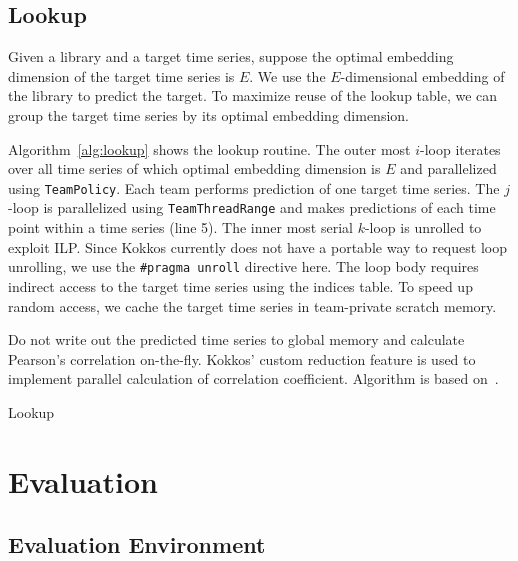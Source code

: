 \documentclass[conference]{IEEEtran}
\begin{document}
\subsection{Lookup}

Given a library and a target time series, suppose the optimal embedding
dimension of the target time series is $E$. We use the $E$-dimensional embedding
of the library to predict the target. To maximize reuse of the lookup table, we
can group the target time series by its optimal embedding dimension.

Algorithm~\ref{alg:lookup} shows the lookup routine. The outer most $i$-loop
iterates over all time series of which optimal embedding dimension is $E$ and
parallelized using \texttt{TeamPolicy}. Each team performs prediction of one
target time series. The $j$-loop is parallelized using \texttt{TeamThreadRange}
and makes predictions of each time point within a time series (line 5). The
inner most serial $k$-loop is unrolled to exploit ILP\@. Since Kokkos currently
does not have a portable way to request loop unrolling, we use the
\texttt{\#pragma unroll} directive here. The loop body requires indirect access
to the target time series using the indices table. To speed up random access, we
cache the target time series in team-private scratch memory.

Do not write out the predicted time series to global memory and calculate
Pearson’s correlation on-the-fly. Kokkos’ custom reduction feature is used to
implement parallel calculation of correlation coefficient. Algorithm is
based on~\cite{Schubert2018}.

\begin{algorithm}
    \SetAlgoLined
    \DontPrintSemicolon
    \caption{Lookup}%
    \label{alg:lookup}
\end{algorithm}

\section{Evaluation}\label{sec:evaluation}

\subsection{Evaluation Environment}
\end{document}
